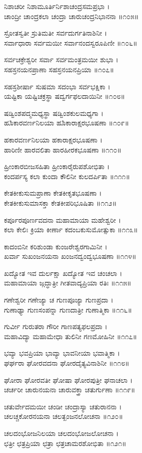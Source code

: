 ನಿಶಾಚರೀ ನಿಶಾಮೂರ್ತಿರ್ನಿಶಾಚಂದ್ರಸಮಪ್ರಭಾ ।\\
ಚಾಂದ್ರೀ ಚಾಂದ್ರಕಲಾ ಚಂದ್ರಾ ಚಾರುಚಂದ್ರನಿಭಾನನಾ ॥೧೦೫॥

ಸ್ರೋತಸ್ವತೀ ಸ್ರುತಿಮತೀ ಸರ್ವದುರ್ಗತಿನಾಶಿನೀ ।\\
ಸರ್ವಾಧಾರಾ ಸರ್ವಮಯೀ ಸರ್ವಾನಂದಸ್ವರೂಪಿಣೀ ॥೧೦೬॥

ಸರ್ವಚಕ್ರೇಶ್ವರೀ ಸರ್ವಾ ಸರ್ವಮಂತ್ರಮಯೀ ಶುಭಾ ।\\
ಸಹಸ್ರನಯನಪ್ರಾಣಾ ಸಹಸ್ರನಯನಪ್ರಿಯಾ ॥೧೦೭॥

ಸಹಸ್ರಶೀರ್ಷಾ ಸುಷಮಾ ಸದಂಭಾ ಸರ್ವಭಕ್ಷಿಕಾ ।\\
ಯಷ್ಟಿಕಾ ಯಷ್ಟಿಚಕ್ರಸ್ಥಾ ಷದ್ವರ್ಗಫಲದಾಯಿನೀ ॥೧೦೮॥

ಷಡ್ವಿಂಶಪದ್ಮಮಧ್ಯಸ್ಥಾ ಷಡ್ವಿಂಶಕುಲಮಧ್ಯಗಾ ।\\
ಹೂಁಕಾರವರ್ಣನಿಲಯಾ ಹೂಁಕಾರಾಕ್ಷರಭೂಷಣಾ ॥೧೦೯॥

ಹಕಾರವರ್ಣನಿಲಯಾ ಹಕಾರಾಕ್ಷರಭೂಷಣಾ ।\\
ಹಾರಿಣೀ ಹಾರವಲಿತಾ ಹಾರಹೀರಕಭೂಷಣಾ ॥೧೧೦॥

ಹ್ರೀಂಕಾರಬೀಜಸಹಿತಾ ಹ್ರೀಂಕಾರೈರುಪಶೋಭಿತಾ ।\\
ಕಂದರ್ಪಸ್ಯ ಕಲಾ ಕುಂದಾ ಕೌಲಿನೀ ಕುಲದರ್ಪಿತಾ ॥೧೧೧॥

ಕೇತಕೀಕುಸುಮಪ್ರಾಣಾ ಕೇತಕೀಕೃತಭೂಷಣಾ ।\\
ಕೇತಕೀಕುಸುಮಾಸಕ್ತಾ ಕೇತಕೀಪರಿಭೂಷಿತಾ ॥೧೧೨॥

ಕರ್ಪೂರಪೂರ್ಣವದನಾ ಮಹಾಮಾಯಾ ಮಹೇಶ್ವರೀ ।\\
ಕಲಾ ಕೇಲಿಃ ಕ್ರಿಯಾ ಕೀರ್ಣಾ ಕದಂಬಕುಸುಮೋತ್ಸುಕಾ ॥೧೧೩॥

ಕಾದಂಬಿನೀ ಕರಿಶುಂಡಾ ಕುಂಜರೇಶ್ವರಗಾಮಿನೀ ।\\
ಖರ್ವಾ ಸುಖಂಜನಯನಾ ಖಂಜನದ್ವಂದ್ವಭೂಷಣಾ ॥೧೧೪॥

ಖದ್ಯೋತ ಇವ ದುರ್ಲಕ್ಷಾ ಖದ್ಯೋತ ಇವ ಚಂಚಲಾ ।\\
ಮಹಾಮಾಯಾ ಜ್ಗದ್ಧಾತ್ರೀ ಗೀತವಾದ್ಯಪ್ರಿಯಾ ರತಿಃ ॥೧೧೫॥

ಗಣೇಶ್ವರೀ ಗಣೇಜ್ಯಾ ಚ ಗುಣಪೂಜ್ಯಾ ಗುಣಪ್ರದಾ ।\\
ಗುಣಾಢ್ಯಾ ಗುಣಸಂಪನ್ನಾ ಗುಣದಾತ್ರೀ ಗುಣಾತ್ಮಿಕಾ ॥೧೧೬॥

ಗುರ್ವೀ ಗುರುತರಾ ಗೌರೀ ಗಾಣಪತ್ಯಫಲಪ್ರದಾ ।\\
ಮಹಾವಿದ್ಯಾ ಮಹಾಮೇಧಾ ತುಲಿನೀ ಗಣಮೋಹಿನೀ ॥೧೧೭॥

ಭವ್ಯಾ ಭವಪ್ರಿಯಾ ಭಾವ್ಯಾ ಭಾವನೀಯಾ ಭವಾತ್ಮಿಕಾ ।\\
ಘರ್ಘರಾ ಘೋರವದನಾ ಘೋರದೈತ್ಯವಿನಾಶಿನೀ ॥೧೧೮॥

ಘೋರಾ ಘೋರವತೀ ಘೋಷಾ ಘೋರಪುತ್ರೀ ಘನಾಚಲಾ ।\\
ಚರ್ಚರೀ ಚಾರುನಯನಾ ಚಾರುವಕ್ತ್ರಾ ಚತುರ್ಗುಣಾ ॥೧೧೯॥

ಚತುರ್ವೇದಮಯೀ ಚಂಡೀ ಚಂದ್ರಾಸ್ಯಾ ಚತುರಾನನಾ ।\\
ಚಲಚ್ಚಕೋರನಯನಾ ಚಲತ್ಖಂಜನಲೋಚನಾ ॥೧೨೦॥

ಚಲದಂಭೋಜನಿಲಯಾ ಚಲದಂಭೋಜಲೋಚನಾ ।\\
ಛತ್ರೀ ಛತ್ರಪ್ರಿಯಾ ಛತ್ರಾ ಛತ್ರಚಾಮರಶೋಭಿತಾ ॥೧೨೧॥

